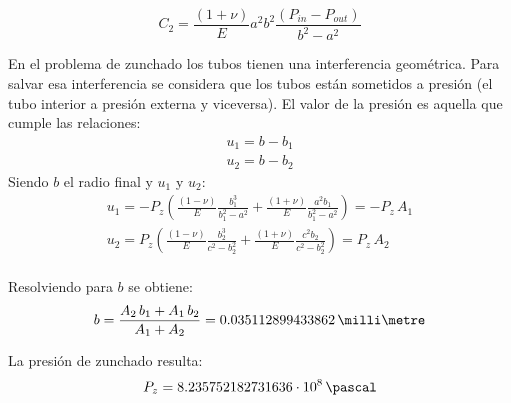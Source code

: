 \begin{equation}
C_2=\frac{(1+\nu)}{E}a^2b^2\frac{(P_{in}-P_{out})}{b^2-a^2}
\end{equation}

En el problema de zunchado los tubos tienen una interferencia geom\'etrica. Para salvar esa interferencia se considera que los tubos est\'an sometidos a presi\'on (el tubo interior a presi\'on externa y viceversa). El valor de la presi\'on es aquella que cumple las relaciones:
\begin{eqnarray}
u_1=b-b_1\\
u_2=b-b_2
\end{eqnarray}
Siendo $b$ el radio final y $u_1$ y $u_2$:
\begin{eqnarray}
u_1=-P_z\left(\frac{(1-\nu)}{E}\frac{b_1^3}{b_1^2-a^2}+\frac{(1+\nu)}{E}\frac{a^2b_1}{b_1^2-a^2}\right) =-P_z\,A_1\\
u_2=P_z\left(\frac{(1-\nu)}{E}\frac{b_2^3}{c^2-b_2^2}+\frac{(1+\nu)}{E}\frac{c^2b_2}{c^2-b_2^2}\right) =P_z\,A_2\\
\end{eqnarray}

Resolviendo para $b$ se obtiene:
\begin{equation}
b=\frac{A_2\,b_1+A_1\,b_2}{A_1+A_2}=0.035112899433862\,\milli\metre
\end{equation}


La presi\'on de zunchado resulta:
\begin{equation}
P_z=8.235752182731636\cdot10^8\,\pascal
\end{equation}






